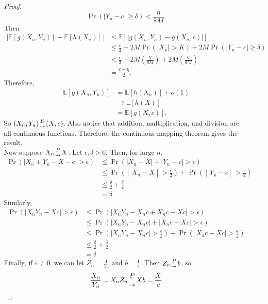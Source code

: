 \documentclass{article}
\theoremstyle{definition}\newtheorem{definition}{DEF}
\theoremstyle{definition}\newtheorem{example}{Ex}
\theoremstyle{lemma}\newtheorem{lemma}{Lemma}
\theoremstyle{corrolary}\newtheorem{corrolary}{Cor}
\begin{document}
\begin{proof}
\begin{equation*}
\Pr(|Y_n-c|\geq \delta)<\frac{\eta}{8M}.
\end{equation*}
Then
\begin{align*}
\left|\mathbb{E}[g(X_n, Y_n)]-\mathbb{E}[h(X_n)]\right|
&\leq \mathbb{E}\left[\left|g(X_n, Y_n)-g(X_n,c)\right|\right] \\
&\leq \frac{\epsilon}{2} + 2M\Pr(|X_n|>K) + 2M\Pr(|Y_n-c|\geq \delta) \\
&< \frac{\epsilon}{2} + 2M\left(\frac{\eta}{8M}\right) + 2M\left(\frac{\eta}{8M}\right)\\
&= \frac{\epsilon+\eta}{2}.
\end{align*}
Therefore,
\begin{align*}
\mathbb{E}[g(X_n, Y_n)]
&= \mathbb{E}[h(X_n)] + o(1)\\
&\rightarrow \mathbb{E}[h(X)]\\
&= \mathbb{E}[g(X,c)].
\end{align*}
So $(X_n, Y_n) {D \atop \rightarrow} (X,c)$.
Also notice that addition, multiplication, and division are all continuous functions.
Therefore, the continuous mapping theorem gives the result. \\
Now suppose $X_n {P\atop \rightarrow} X$.
Let $\epsilon, \delta>0$.
Then, for large $n$,
\begin{align*}
\Pr(|X_n +Y_n -X -c|>\epsilon) &\leq \Pr(|X_n -X| + |Y_n -c|>\epsilon)\\
&\leq \Pr\left(\middle|X_n -X\middle|>\frac{\epsilon}{2}\right) + \Pr\left(\middle|Y_n -c\middle|>\frac{\epsilon}{2}\right)\\
&\leq \frac{\delta}{2} + \frac{\delta}{2}\\
&= \delta
\end{align*}
Similarly,
\begin{align*}
\Pr(|X_n Y_n - Xc|>\epsilon)&\leq \Pr(|X_n Y_n -X_n c +X_n c-Xc|>\epsilon)\\
&\leq \Pr(|X_n Y_n -X_n c| + |X_n c - Xc|>\epsilon)\\
&\leq \Pr(|X_n Y_n - X_n c|>\frac{\epsilon}{2}) + \Pr(|X_n c-Xc|>\frac{\epsilon}{2})\\
&\leq \frac{\delta}{2} + \frac{\delta}{2}\\
&=\delta
\end{align*}
Finally, if $c\neq 0$, we can let $Z_n = \frac{1}{Y_n}$ and $b=\frac{1}{c}$.
Then  $Z_n {P \atop \rightarrow} b$, so 
$$\frac{X_n}{Y_n} = X_n Z_n {P \atop \rightarrow} Xb=\frac{X}{c}$$
\end{proof}
\end{document}

